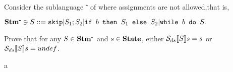 \newcommand{\stmminus}{\stm{}\textsuperscript{\textbf{-}}}

{
    Consider the sublanguage \stmminus{} of \stm{} where assignments are not allowed,that is,
    \begin{center}
    $\stmminus{} \ni{} S ::= \skipistr | S_1;S_2 | \ifABC{b}{S_1}{S_2} | \wbS{b}{S}.$
    \end{center}
    Prove that for any $S\in\stmminus{}$ and $s\in\mbox{\textbf{State}}$, either $\mathcal{S}_{ds}\llbracket S \rrbracket{}s=s$ or $\mathcal{S}_{ds}\llbracket S \rrbracket{}s=undef$.
}
{
    a
}
\newpage